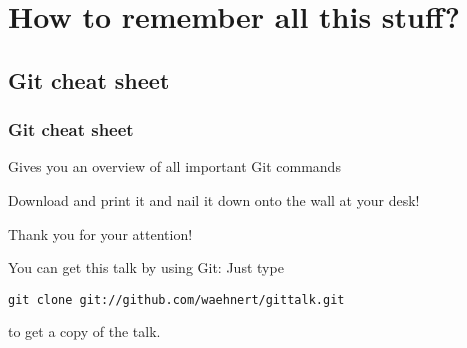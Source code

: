 \documentclass{beamer}
\begin{document}
\section{How to remember all this stuff?}
\subsection{Git cheat sheet}
\begin{frame}
  \frametitle{Git cheat sheet}
  Gives you an overview of all important Git commands
  \begin{center}
  \end{center}
  Download and print it and nail it down onto the wall at your desk!
\end{frame}

\begin{frame}
  \begin{center}{}
    \begin{LARGE}
      Thank you for your attention!
    \end{LARGE}
  \end{center}\bigskip

You can get this talk by using Git: Just type\smallskip

\quad\texttt{git clone git://github.com/waehnert/gittalk.git}\smallskip

to get a copy of the talk.
\end{frame}
\end{document}
